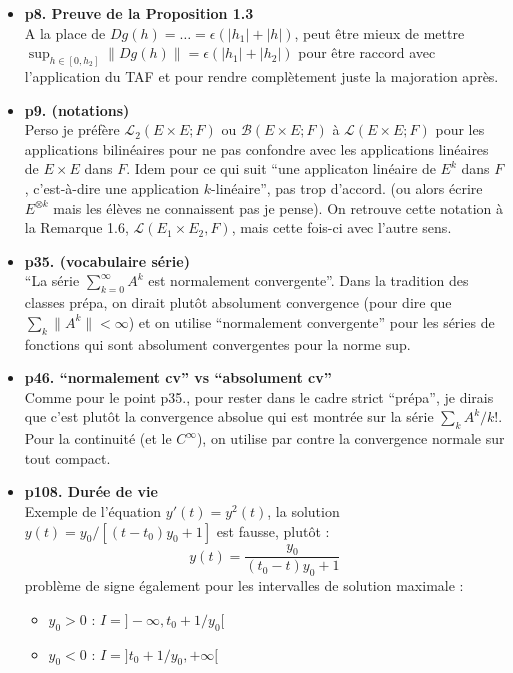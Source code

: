 \documentclass[11pt,a4paper]{article}
\newcommand{\vide}{\Large $\square$}
\begin{document}
\begin{itemize}
    \item[\vide] \textbf{p8. Preuve de la Proposition 1.3} \\
        A la place de $Dg(h) = \dots = \epsilon(|h_1| + |h|)$, peut être mieux de mettre $\sup_{h \in [0, h_2]} \| Dg(h) \| = \epsilon(|h_1| + |h_2|)$ pour être raccord avec l'application du TAF et pour rendre complètement juste la majoration après.
    
    \item[\vide] \textbf{p9. (notations)} \\
        Perso je préfère $\mathcal L_2(E \times E ; F)$ ou $\mathcal B(E \times E ; F)$ à $\mathcal L(E \times E ; F)$ pour les applications bilinéaires pour ne pas confondre avec les applications linéaires de $E \times E$ dans $F$.
        Idem pour ce qui suit ``une applicaton linéaire de $E^k$ dans $F$, c'est-à-dire une application $k$-linéaire'', pas trop d'accord. (ou alors écrire $E^{\otimes k}$ mais les élèves ne connaissent pas je pense). 
        On retrouve cette notation à la Remarque 1.6, $\mathcal L(E_1 \times E_2, F)$, mais cette fois-ci avec l'autre sens.

    \item[\vide] \textbf{p35. (vocabulaire série)} \\ 
        ``La série $\sum_{k=0}^\infty A^k$ est normalement convergente''. Dans la tradition des classes prépa, on dirait plutôt absolument convergence (pour dire que $\sum_{k} \| A^k \| < \infty$) et on utilise ``normalement convergente'' pour les séries de fonctions qui sont absolument convergentes pour la norme sup.

    \item[\vide] \textbf{p46. ``normalement cv'' vs ``absolument cv''} \\
        Comme pour le point p35., pour rester dans le cadre strict ``prépa'', je dirais que c'est plutôt la convergence absolue qui est montrée sur la série $\sum_k A^k / k!$. Pour la continuité (et le $C^\infty$), on utilise par contre la convergence normale sur tout compact.
    
    \item[\vide] \textbf{p108. Durée de vie} \\
        Exemple de l'équation $y'(t) = y^2(t)$, la solution $y(t) = y_0 / [(t - t_0) y_0 + 1]$ est fausse, plutôt :
        $$ y(t) = \frac{y_0}{(t_0 - t) y_0 + 1} $$
        problème de signe également pour les intervalles de solution maximale :
        \begin{itemize}
            \item $y_0 > 0$ : $I = ]-\infty, t_0 + 1/y_0[$
            \item $y_0 < 0$ : $I = ]t_0 + 1/y_0, +\infty[$
        \end{itemize}
    

\end{itemize}
\end{document}
